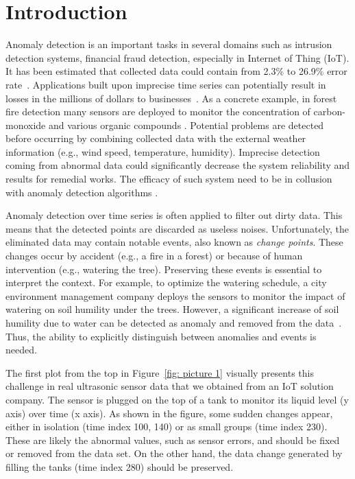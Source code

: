 \section{Introduction}

Anomaly detection is an important tasks in several domains such as intrusion detection systems, financial fraud detection, especially in Internet of Thing (IoT). It has been estimated that collected data could contain from 2.3\% to 26.9\% error rate~\cite{goldberg2008analysis}. Applications built upon imprecise time series can potentially result in losses in the millions of dollars to businesses~\cite{cleaningSource}. As a concrete example, in forest fire detection many sensors are deployed to monitor the concentration of carbon-monoxide and various organic compounds \cite{alkhatib2014review}. Potential problems are detected before occurring by combining collected data with the external weather information (e.g., wind speed, temperature, humidity). Imprecise detection coming from abnormal data could significantly decrease the system reliability and results for remedial works. The efficacy of such system need to be in collusion with anomaly detection algorithms \cite{mehrotra2017anomaly}.\\

\par Anomaly detection over time series is often applied to filter out dirty data. This means that the detected points are discarded as useless noises. Unfortunately, the eliminated data may contain notable events, also known as {\em change points}. These changes occur by accident (e.g., a fire in a forest) or because of human intervention (e.g., watering the tree). Preserving these events is essential to interpret the context. For example, to optimize the watering schedule, a city environment management company deploys the sensors to monitor the impact of watering on soil humility under the trees. However, a significant increase of soil humility due to water can be detected as anomaly and removed from the data~\cite{kang2013prevention}. Thus, the ability to explicitly distinguish between anomalies and events is needed.\\

\par The first plot from the top in Figure~\ref{fig: picture 1} visually presents this challenge in real ultrasonic sensor data that we obtained from an IoT solution company. The sensor is plugged on the top of a tank to monitor its liquid level (y axis) over time (x axis). As shown in the figure, some sudden changes appear, either in isolation (time index 100, 140) or as small groups (time index 230). These are likely the abnormal values, such as sensor errors, and should be fixed or removed from the data set. On the other hand, the data change generated by filling the tanks (time index 280) should be preserved.\\

